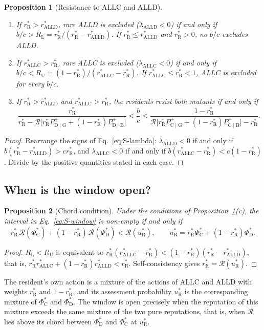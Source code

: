 \documentclass[fleqn,10pt]{article}
\theoremstyle{plain}
\newtheorem{proposition}{Proposition}
\theoremstyle{remark}
\newcommand{\Rm}{\mathcal R}
\newcommand{\C}{\mathrm C}
\newcommand{\D}{\mathrm D}
\newcommand{\ALLC}{\mathrm{ALLC}}
\newcommand{\ALLD}{\mathrm{ALLD}}
\newcommand{\Pp}[2]{P^+_{\mathrm{#1}\mid\mathrm{#2}}}
\newcommand{\rR}{r^*_{\mathrm R}}
\newcommand{\uR}{u^*_{\mathrm R}}
\begin{document}
\begin{proposition}[Resistance to ALLC and ALLD]\label{prop:window}
\begin{enumerate}
\item[(a)] If $\rR>r^*_{\ALLD}$, rare ALLD is excluded ($\lambda_{\ALLD}<0$) if and
only if $b/c>R_{\mathrm L}=\rR/(\rR-r^*_{\ALLD})$. If $\rR\le r^*_{\ALLD}$ and
$\rR>0$, no $b/c$ excludes ALLD.
\item[(b)] If $r^*_{\ALLC}>\rR$, rare ALLC is excluded ($\lambda_{\ALLC}<0$) if and
only if $b/c<R_{\mathrm U}=(1-\rR)/(r^*_{\ALLC}-\rR)$. If $r^*_{\ALLC}\le\rR<1$,
ALLC is excluded for every $b/c$.
\item[(c)] If $\rR>r^*_{\ALLD}$ and $r^*_{\ALLC}>\rR$, the residents resist both
mutants if and only if
\begin{equation}
\frac{\rR}{\rR-\Rm\bigl[\rR\Pp DG+(1-\rR)\Pp DB\bigr]}
<\frac bc<
\frac{1-\rR}{\Rm\bigl[\rR\Pp CG+(1-\rR)\Pp CB\bigr]-\rR}.
\label{eq:S-window}
\end{equation}
\end{enumerate}
\end{proposition}
\begin{proof}
Rearrange the signs of Eq.~\eqref{eq:S-lambda}: $\lambda_{\ALLD}<0$ if and only if
$b(\rR-r^*_{\ALLD})>c\rR$, and $\lambda_{\ALLC}<0$ if and only if
$b(r^*_{\ALLC}-\rR)<c(1-\rR)$. Divide by the positive quantities stated in each
case.
\end{proof}

\subsection{When is the window open?}
\begin{proposition}[Chord condition]\label{prop:chord}
Under the conditions of Proposition~\ref{prop:window}(c), the interval in
Eq.~\eqref{eq:S-window} is non-empty if and only if
\begin{equation}
\rR\,\Rm(\Phi^*_\C)+(1-\rR)\,\Rm(\Phi^*_\D)<\Rm(\uR),
\qquad \uR=\rR\Phi^*_\C+(1-\rR)\Phi^*_\D .
\label{eq:S-chord}
\end{equation}
\end{proposition}
\begin{proof}
$R_{\mathrm L}<R_{\mathrm U}$ is equivalent to
$\rR(r^*_{\ALLC}-\rR)<(1-\rR)(\rR-r^*_{\ALLD})$, that is,
$\rR r^*_{\ALLC}+(1-\rR)r^*_{\ALLD}<\rR$. Self-consistency gives
$\rR=\Rm(\uR)$.
\end{proof}
The resident's own action is a mixture of the actions of ALLC and ALLD with
weights $\rR$ and $1-\rR$, and its assessment probability $\uR$ is the
corresponding mixture of $\Phi^*_\C$ and $\Phi^*_\D$. The window is open
precisely when the reputation of this mixture exceeds the same mixture of the
two pure reputations, that is, when $\Rm$ lies above its chord between
$\Phi^*_\D$ and $\Phi^*_\C$ at $\uR$.
\end{document}

